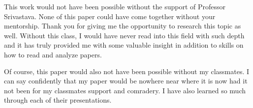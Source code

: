 \documentclass[sigconf]{acmart}
\begin{document}
\begin{acks}
This work would not have been possible without the support of Professor Srivastava. None of this paper could 
have come together without your mentorship. Thank you for giving me the opportunity to
research this topic as well. Without this class, I would have never read into this field with such 
depth and it has truly provided me with some valuable insight in addition to skills on 
how to read and analyze papers. 

Of course, this paper would also not have been possible without my classmates. I can say 
confidently that my paper would be nowhere near where it is now had it not 
been for my classmates support and comradery. I have also learned so much through 
each of their presentations. 
\end{acks}



\end{document}
